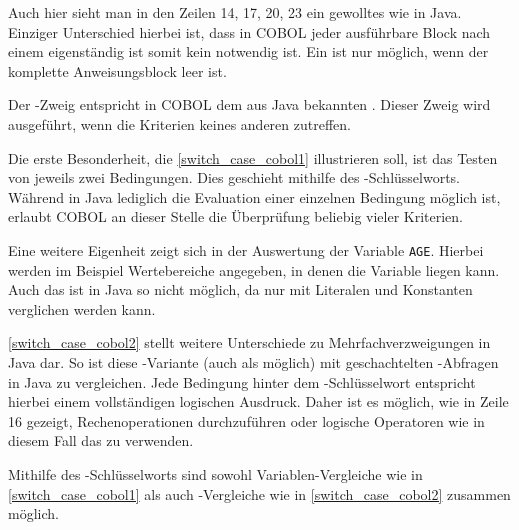 Auch hier sieht man in den Zeilen 14, 17, 20, 23 ein gewolltes  wie in Java. Einziger Unterschied hierbei ist, dass in COBOL jeder ausführbare Block nach einem  eigenständig ist somit kein  notwendig ist. Ein  ist nur möglich, wenn der komplette Anweisungsblock leer ist. 

Der -Zweig entspricht in COBOL dem aus Java bekannten . Dieser Zweig wird ausgeführt, wenn die Kriterien keines anderen zutreffen.

Die erste Besonderheit, die \autoref{switch_case_cobol1} illustrieren soll, ist das Testen von jeweils zwei Bedingungen. Dies geschieht mithilfe des -Schlüsselworts. Während in Java lediglich die Evaluation einer einzelnen Bedingung möglich ist, erlaubt COBOL an dieser Stelle die Überprüfung beliebig vieler Kriterien.


Eine weitere Eigenheit zeigt sich in der Auswertung der Variable \texttt{AGE}. Hierbei werden im Beispiel Wertebereiche angegeben, in denen die Variable liegen kann. Auch das ist in Java so nicht möglich, da nur mit Literalen und Konstanten verglichen werden kann.

\autoref{switch_case_cobol2} stellt weitere Unterschiede zu Mehrfachverzweigungen in Java dar. So ist diese -Variante (auch als  möglich) mit geschachtelten -Abfragen in Java zu vergleichen. Jede Bedingung hinter dem -Schlüsselwort entspricht hierbei einem vollständigen logischen Ausdruck. Daher ist es möglich, wie in Zeile 16 gezeigt, Rechenoperationen durchzuführen oder logische Operatoren wie in diesem Fall das  zu verwenden. 


Mithilfe des -Schlüsselworts sind sowohl Variablen-Vergleiche wie in \autoref{switch_case_cobol1} als auch -Vergleiche wie in \autoref{switch_case_cobol2} zusammen möglich.